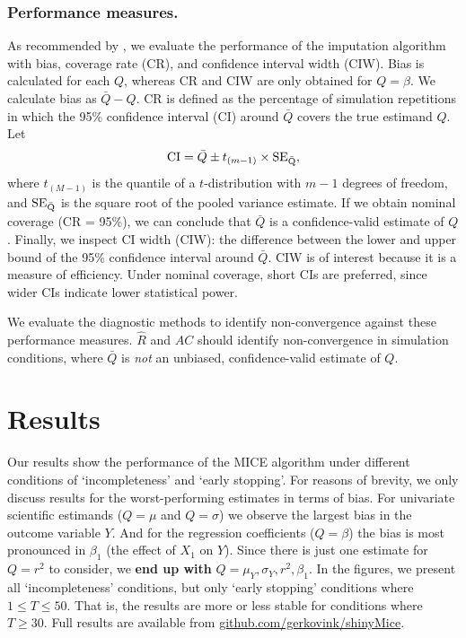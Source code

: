 \documentclass[Royal,times,sageh]{sagej}
\begin{document}
\hypertarget{performance-measures.}{%
\subsubsection{Performance measures.}\label{performance-measures.}}

As recommended by \citet{buur18}, we evaluate the performance of the imputation algorithm with bias, coverage rate (CR), and confidence interval width (CIW). Bias is calculated for each \(Q\), whereas CR and CIW are only obtained for \(Q = \beta\). We calculate bias as \(\bar{Q} - Q\). CR is defined as the percentage of simulation repetitions in which the 95\% confidence interval (CI) around \(\bar{Q}\) covers the true estimand \(Q\). Let
\[\text{CI} = \bar{Q} \pm t_{(m-1)} \times \rm SE_{\bar{Q}},\]
where \(t_{(M-1)}\) is the quantile of a \(t\)-distribution with \(m-1\) degrees of freedom, and \(\rm SE_{\bar{Q}}\) is the square root of the pooled variance estimate. If we obtain nominal coverage (CR = 95\%), we can conclude that \(\bar{Q}\) is a confidence-valid estimate of \(Q\). Finally, we inspect CI width (CIW): the difference between the lower and upper bound of the 95\% confidence interval around \(\bar{Q}\). CIW is of interest because it is a measure of efficiency. Under nominal coverage, short CIs are preferred, since wider CIs indicate lower statistical power.

We evaluate the diagnostic methods to identify non-convergence against these performance measures. \(\widehat{R}\) and \(AC\) should identify non-convergence in simulation conditions, where \(\bar{Q}\) is \emph{not} an unbiased, confidence-valid estimate of \(Q\).

\hypertarget{results}{%
\section{Results}\label{results}}

Our results show the performance of the MICE algorithm under different conditions of `incompleteness' and `early stopping'. For reasons of brevity, we only discuss results for the worst-performing estimates in terms of bias. For univariate scientific estimands (\(Q=\mu\) and \(Q=\sigma\)) we observe the largest bias in the outcome variable \(Y\). And for the regression coefficients (\(Q=\beta\)) the bias is most pronounced in \(\beta_1\) (the effect of \(X_1\) on \(Y\)). Since there is just one estimate for \(Q=r^2\) to consider, we \textbf{end up with} \(Q=\mu_Y, \sigma_Y,r^2, \beta_1\). In the figures, we present all `incompleteness' conditions, but only `early stopping' conditions where \(1 \leq T\leq50\). That is, the results are more or less stable for conditions where \(T \geq 30\). Full results are available from \href{https://github.com/gerkovink/shinyMice/tree/master/3.Thesis/}{github.com/gerkovink/shinyMice}.
\end{document}
